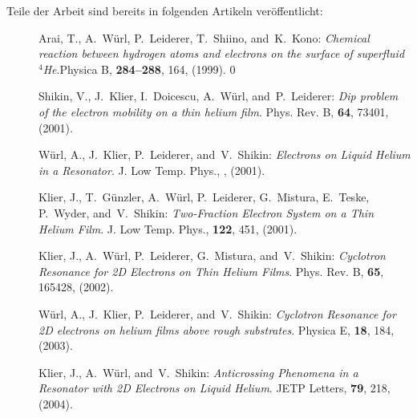 Teile der Arbeit sind bereits in folgenden Artikeln veröffentlicht:

\selectlanguage{\english}
\begin{description}
	\item[\cite{Ara99}] {\sc Arai, T.}, {\sc A.~W{\"u}rl}, {\sc P.~Leiderer}, {\sc T.~Shiino}, and\ {\sc K.~Kono}: {\em {C}hemical reaction between hydrogen atoms and electrons on the surface of superfluid {$^4$}{H}e}.\newblock Physica B, {\bf 284--288}, 164, (1999).
0
	\item[\cite{Shi01}] {\sc Shikin, V.}, {\sc J.~Klier}, {\sc I.~Doicescu}, {\sc A.~W{\"u}rl}, and\ {\sc P.~Leiderer}: {\em {D}ip problem of the electron mobility on a thin helium film}. \newblock Phys. Rev. B, {\bf 64}, 73401, (2001).
	
	\item[\cite{Wue01}] {\sc W{\"u}rl, A.}, {\sc J.~Klier}, {\sc P.~Leiderer}, and\ {\sc V.~Shikin}: {\em {E}lectrons on {L}iquid {H}elium in a {R}esonator}. \newblock J. Low Temp. Phys., {\bf }, (2001).
	
	\item[\cite{Kli01}] {\sc Klier, J.}, {\sc T.~G{\"u}nzler}, {\sc A.~W{\"u}rl}, {\sc P.~Leiderer}, {\sc G.~Mistura}, {\sc E.~Teske}, {\sc P.~Wyder}, and\ {\sc V.~Shikin}: {\em {T}wo-{F}raction {E}lectron {S}ystem on a {T}hin {H}elium {F}ilm}. \newblock J. Low Temp. Phys., {\bf 122}, 451, (2001).
	
	\item[\cite{Kli02}] {\sc Klier, J.}, {\sc A.~W{\"u}rl}, {\sc P.~Leiderer}, {\sc G.~Mistura}, and\ {\sc V.~Shikin}: {\em {C}yclotron {R}esonance for 2{D} {E}lectrons on {T}hin {H}elium {F}ilms}. \newblock Phys. Rev. B, {\bf 65}, 165428, (2002).
	
	\item[\cite{Wue03}] {\sc W{\"u}rl, A.}, {\sc J.~Klier}, {\sc P.~Leiderer}, and\ {\sc V.~Shikin}: {\em {C}yclotron {R}esonance for 2{D} electrons on helium films above rough substrates}. \newblock Physica E, {\bf 18}, 184, (2003).
	
	\item[\cite{Kli04}] {\sc Klier, J.}, {\sc A.~W{\"u}rl}, and\ {\sc V.~Shikin}: {\em {A}nticrossing {P}henomena in a {R}esonator with 2{D} {E}lectrons on {L}iquid {H}elium}. \newblock JETP Letters, {\bf 79}, 218, (2004).
\end{description}
\selectlanguage{\ngerman}

